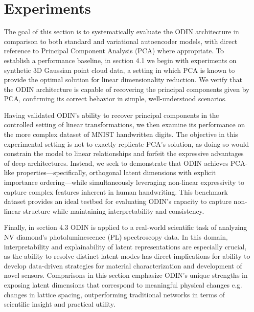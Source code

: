 \documentclass[twoside,11pt]{article}
\begin{document}
\section{Experiments}
The goal of this section is to systematically evaluate the ODIN architecture in comparison to both standard and variational autoencoder models, with direct reference to Principal Component Analysis (PCA) where appropriate. To establish a performance baseline, in section 4.1 we begin with experiments on synthetic 3D Gaussian point cloud data, a setting in which PCA is known to provide the optimal solution for linear dimensionality reduction. We verify that the ODIN architecture is capable of recovering the principal components given by PCA, confirming its correct behavior in simple, well-understood scenarios.

Having validated ODIN's ability to recover principal components in the controlled setting of linear transformations, we then examine its performance on the more complex dataset of MNIST handwritten digits. The objective in this experimental setting is not to exactly replicate PCA's solution, as doing so would constrain the model to linear relationships and forfeit the expressive advantages of deep architectures. Instead, we seek to demonstrate that ODIN achieves PCA-like properties—specifically, orthogonal latent dimensions with explicit importance ordering—while simultaneously leveraging non-linear expressivity to capture complex features inherent in human handwriting. This benchmark dataset provides an ideal testbed for evaluating ODIN's capacity to capture non-linear structure while maintaining interpretability and consistency. 

Finally, in section 4.3 ODIN is applied to a real-world scientific task of analyzing NV diamond's photoluminescence (PL) spectroscopy data. In this domain, interpretability and explainability of latent representations are especially crucial, as the ability to resolve distinct latent modes has direct implications for ability to develop data-driven strategies for material characterization and development of novel sensors. Comparisons in this section emphasize ODIN’s unique strengths in exposing latent dimensions that correspond to meaningful physical changes e.g. changes in lattice spacing, outperforming traditional networks in terms of scientific insight and practical utility.
\end{document}
